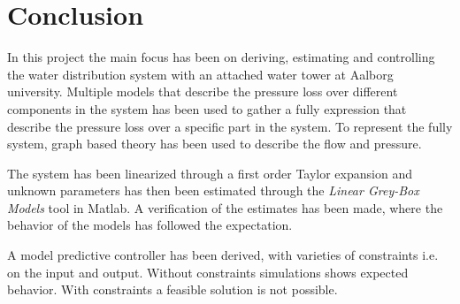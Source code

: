 \chapter{Conclusion}
\label{Conclusion}

In this project the main focus has been on deriving, estimating and controlling the water distribution system with an attached water tower at Aalborg university. Multiple models that describe the pressure loss over different components in the system has been used to gather a fully expression that describe the pressure loss over a specific part in the system. To represent the fully system, graph based theory has been used to describe the flow and pressure. 

The system has been linearized through a first order Taylor expansion and unknown parameters has then been estimated through the \textit{Linear Grey-Box Models} tool in Matlab. A verification of the estimates has been made, where the behavior of the models has followed the expectation. 

A model predictive controller has been derived, with varieties of constraints i.e. on the input and output. Without constraints simulations shows expected behavior. With constraints a feasible solution is not possible. 